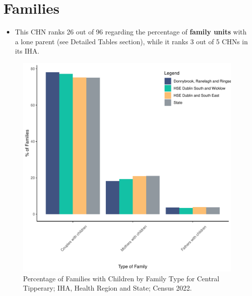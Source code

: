 \documentclass{article}
\begin{document}
\section{Families}\label{sect:Fam}
\begin{itemize}
\item This CHN ranks  26 out of 96 regarding the percentage of \textbf{family units} with a lone parent (see Detailed Tables section), while it ranks   3 out of 5 CHNs in its IHA.
\end{itemize}
\begin{figure}[H]
	\centering
	\includegraphics[width = 150mm]{../figures/FamED.pdf}
	\caption{Percentage of Families with Children by Family Type for Central Tipperary; IHA, Health Region and State; Census 2022.}
	\label{fig:vbnv}
	\end{figure}
	
\end{document}
